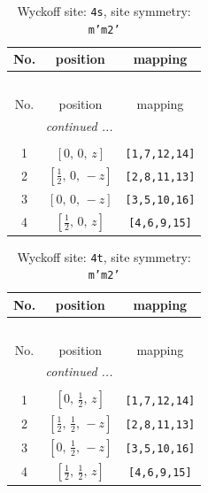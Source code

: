 \documentclass[fleqn,8pt]{jsarticle}
\begin{document}
\renewcommand{\arraystretch}{1.2}
\begin{longtable}{ccc}
\caption{Wyckoff site: {\tt 4s}, site symmetry: {\tt m'm2'}}
 \\
 \hline \hline
No. & position & mapping \\ \hline \endfirsthead

\multicolumn{2}{l}{\tablename\ \thetable{}} \\
 \hline \hline
No. & position & mapping \\ \hline \endhead

 \hline \hline
\multicolumn{2}{r}{\footnotesize\it continued ...} \\ \endfoot

 \hline \hline
\multicolumn{2}{r}{} \\ \endlastfoot

1 & $\left[ 0,\, 0,\, z \right]$ & {\tt [1,7,12,14]} \\ \hline
2 & $\left[ \frac{1}{2},\, 0,\, - z \right]$ & {\tt [2,8,11,13]} \\ \hline
3 & $\left[ 0,\, 0,\, - z \right]$ & {\tt [3,5,10,16]} \\ \hline
4 & $\left[ \frac{1}{2},\, 0,\, z \right]$ & {\tt [4,6,9,15]} \\
\end{longtable}
\renewcommand{\arraystretch}{1.2}
\begin{longtable}{ccc}
\caption{Wyckoff site: {\tt 4t}, site symmetry: {\tt m'm2'}}
 \\
 \hline \hline
No. & position & mapping \\ \hline \endfirsthead

\multicolumn{2}{l}{\tablename\ \thetable{}} \\
 \hline \hline
No. & position & mapping \\ \hline \endhead

 \hline \hline
\multicolumn{2}{r}{\footnotesize\it continued ...} \\ \endfoot

 \hline \hline
\multicolumn{2}{r}{} \\ \endlastfoot

1 & $\left[ 0,\, \frac{1}{2},\, z \right]$ & {\tt [1,7,12,14]} \\ \hline
2 & $\left[ \frac{1}{2},\, \frac{1}{2},\, - z \right]$ & {\tt [2,8,11,13]} \\ \hline
3 & $\left[ 0,\, \frac{1}{2},\, - z \right]$ & {\tt [3,5,10,16]} \\ \hline
4 & $\left[ \frac{1}{2},\, \frac{1}{2},\, z \right]$ & {\tt [4,6,9,15]} \\
\end{longtable}
\end{document}
